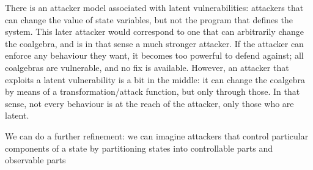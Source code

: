 {\color{red}
There is an attacker model associated with latent vulnerabilities: attackers that can change the value of state variables, but not the program that defines the system. This later attacker would correspond to one that can arbitrarily change the coalgebra, and is in that sense a much stronger attacker. If the attacker can enforce any behaviour they want, it becomes too powerful to defend against; all coalgebras are vulnerable, and no fix is available. However, an attacker that exploits a latent vulnerability is a bit in the middle: it can change the coalgebra by means of a transformation/attack function, but only through those. In that sense, not every behaviour is at the reach of the attacker, only those who are latent.

We can do a further refinement: we can imagine attackers that control particular components of a state by partitioning states into controllable parts and observable parts

}
